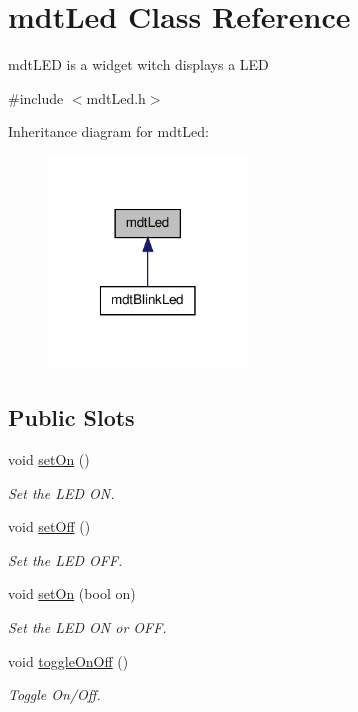 \hypertarget{classmdt_led}{
\section{mdtLed Class Reference}
\label{classmdt_led}
}


mdtLED is a widget witch displays a LED  




{\ttfamily \#include $<$mdtLed.h$>$}



Inheritance diagram for mdtLed:\nopagebreak
\begin{figure}[H]
\begin{center}
\leavevmode
\includegraphics[width=150pt]{classmdt_led__inherit__graph}
\end{center}
\end{figure}
\subsection*{Public Slots}
\begin{DoxyCompactItemize}
\item 
\hypertarget{classmdt_led_a389ee3e0082ce8fa38cb258944a04892}{
void \hyperlink{classmdt_led_a389ee3e0082ce8fa38cb258944a04892}{setOn} ()}
\label{classmdt_led_a389ee3e0082ce8fa38cb258944a04892}

\begin{DoxyCompactList}\small\item\em Set the LED ON. \end{DoxyCompactList}\item 
\hypertarget{classmdt_led_a4c8f5f6aa91b7c90ae6b1aa4933ba6e0}{
void \hyperlink{classmdt_led_a4c8f5f6aa91b7c90ae6b1aa4933ba6e0}{setOff} ()}
\label{classmdt_led_a4c8f5f6aa91b7c90ae6b1aa4933ba6e0}

\begin{DoxyCompactList}\small\item\em Set the LED OFF. \end{DoxyCompactList}\item 
void \hyperlink{classmdt_led_aabbe7fcb23d539946dffec4526c89495}{setOn} (bool on)
\begin{DoxyCompactList}\small\item\em Set the LED ON or OFF. \end{DoxyCompactList}\item 
void \hyperlink{classmdt_led_a9e86ff65f2ec1bfb6131e2b9042609e8}{toggleOnOff} ()
\begin{DoxyCompactList}\small\item\em Toggle On/Off. \end{DoxyCompactList}\end{DoxyCompactItemize}
